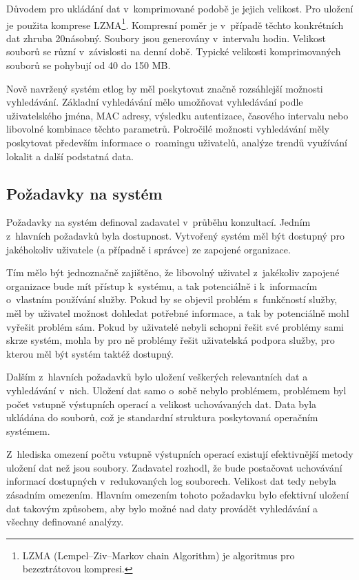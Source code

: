 \documentclass[thesis=M,czech]{FITthesis}[2012/06/26]
\begin{document}
    Důvodem pro ukládání dat v~komprimované podobě je jejich velikost.
    Pro uložení je použita komprese LZMA\footnote{
      LZMA (Lempel--Ziv--Markov chain Algorithm) je algoritmus pro bezeztrátovou kompresi.
    }.
    Kompresní poměr je v~případě těchto konkrétních dat zhruba 20násobný.
    Soubory jsou generovány v~intervalu hodin. 
    Velikost souborů se různí v~závislosti na denní době.
    Typické velikosti komprimovaných souborů se pohybují od 40 do 150 MB.

    Nově navržený systém etlog by měl poskytovat značně rozsáhlejší možnosti vyhledávání.
    Základní vyhledávání mělo umožňovat vyhledávání podle uživatelského jména,
    MAC adresy, výsledku autentizace, časového intervalu nebo libovolné kombinace těchto parametrů.
    Pokročilé možnosti vyhledávání měly poskytovat především informace
    o~roamingu uživatelů, analýze trendů využívání lokalit a další podstatná data.

  \subsection{Požadavky na systém}

    Požadavky na systém definoval zadavatel v~průběhu konzultací.
    Jedním z~hlavních požadavků byla dostupnost.
    Vytvořený systém měl být dostupný pro jakéhokoliv uživatele (a případně i správce)
    ze zapojené organizace.

    Tím mělo být jednoznačně zajištěno, že libovolný uživatel z~jakékoliv zapojené organizace
    bude mít přístup k~systému, a tak potenciálně i k~informacím o~vlastním používání služby.
    Pokud by se objevil problém s~funkčností služby, měl by uživatel možnost dohledat
    potřebné informace, a tak by potenciálně mohl vyřešit problém sám.
    Pokud by uživatelé nebyli schopni řešit své problémy sami skrze systém,
    mohla by pro ně problémy řešit uživatelská podpora služby, pro kterou
    měl být systém taktéž dostupný.

    Dalším z~hlavních požadavků bylo uložení veškerých relevantních dat
    a vyhledávání v~nich.
    Uložení dat samo o~sobě nebylo problémem, 
    problémem byl počet vstupně výstupních operací a velikost uchovávaných dat.
    Data byla ukládána do souborů, což je standardní struktura poskytovaná operačním systémem.
    
    Z~hlediska omezení počtu vstupně výstupních operací existují efektivnější
    metody uložení dat než jsou soubory.
    Zadavatel rozhodl, že bude postačovat uchovávání informací dostupných v~redukovaných log souborech.
    Velikost dat tedy nebyla zásadním omezením. 
    Hlavním omezením tohoto požadavku bylo efektivní uložení dat takovým způsobem,
    aby bylo možné nad daty provádět vyhledávání a všechny definované analýzy.
\end{document}
